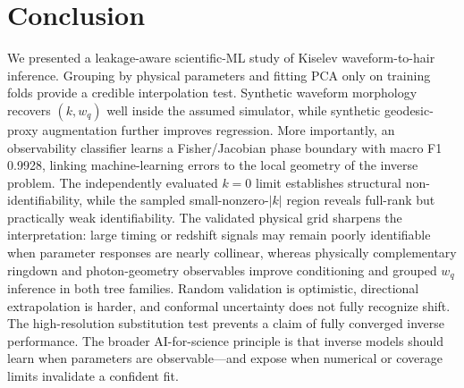 \documentclass[conference]{IEEEtran}
\newcommand{\wq}{w_q}
\begin{document}
\FloatBarrier
\section{Conclusion}
We presented a leakage-aware scientific-ML study of Kiselev waveform-to-hair
inference. Grouping by physical parameters and fitting PCA only on training
folds provide a credible interpolation test. Synthetic waveform morphology
recovers $(k,\wq)$ well inside the assumed simulator, while synthetic
geodesic-proxy augmentation further improves regression. More importantly, an
observability classifier learns a Fisher/Jacobian phase boundary with macro F1
0.9928, linking machine-learning errors to the local geometry of the inverse
problem. The independently evaluated $k=0$ limit establishes structural
non-identifiability, while the sampled small-nonzero-$|k|$ region reveals
full-rank but practically weak identifiability. The validated physical grid
sharpens the interpretation: large timing or redshift signals may remain poorly
identifiable when parameter responses are nearly collinear, whereas physically
complementary ringdown and photon-geometry observables improve conditioning and
grouped $\wq$ inference in both tree families. Random validation is optimistic,
directional extrapolation is harder, and conformal uncertainty does not fully
recognize shift. The high-resolution substitution test prevents a claim of
fully converged inverse performance. The broader AI-for-science principle is
that inverse models should learn when parameters are observable---and expose
when numerical or coverage limits invalidate a confident fit.

\FloatBarrier


\end{document}
